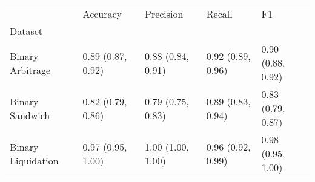 \begin{tabular}{lllll}
\toprule
{} &           Accuracy &          Precision &             Recall &                 F1 \\
Dataset            &                    &                    &                    &                    \\
\midrule
Binary Arbitrage   &  0.89 (0.87, 0.92) &  0.88 (0.84, 0.91) &  0.92 (0.89, 0.96) &  0.90 (0.88, 0.92) \\
Binary Sandwich    &  0.82 (0.79, 0.86) &  0.79 (0.75, 0.83) &  0.89 (0.83, 0.94) &  0.83 (0.79, 0.87) \\
Binary Liquidation &  0.97 (0.95, 1.00) &  1.00 (1.00, 1.00) &  0.96 (0.92, 0.99) &  0.98 (0.95, 1.00) \\
\bottomrule
\end{tabular}
